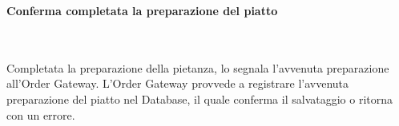 \subsubsection{\Chef{}}

\begin{samepage}
\paragraph{Conferma completata la preparazione del piatto}\mbox{}\\
\end{samepage}
Completata la preparazione della pietanza, lo \Chef{} segnala l'avvenuta preparazione all'Order Gateway. L'Order Gateway provvede a registrare l'avvenuta preparazione del piatto nel Database, il quale conferma il salvataggio o ritorna con un errore.


\subsubsection{\Deliveryman{}}

